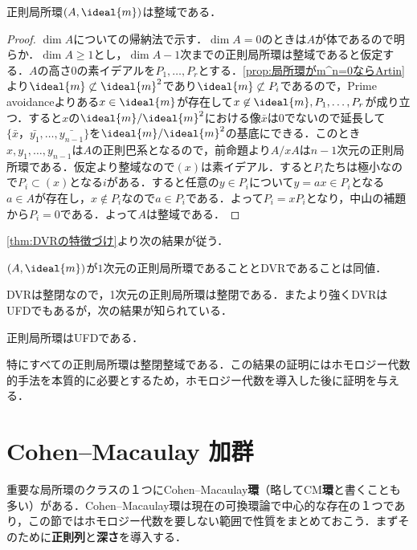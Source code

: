 \begin{thm}\label{thm:正則局所環は整域}
	正則局所環$(A,\ideal{m})$は整域である．
\end{thm}

\begin{proof}
	$\dim A$についての帰納法で示す．$\dim A=0$のときは$A$が体であるので明らか．$\dim A\geq 1$とし，$\dim A-1$次までの正則局所環は整域であると仮定する．$A$の高さ$0$の素イデアルを$P_1,\dots,P_r$とする．\ref{prop:局所環がm^n=0ならArtin}より$\ideal{m}\not\subset\ideal{m}^2$であり$\ideal{m}\not\subset P_i$であるので，Prime avoidanceよりある$x\in\ideal{m}$が存在して$x\not\in\ideal{m},P_1,\dots,P_r$が成り立つ．すると$x$の$\ideal{m}/\ideal{m}^2$における像$\bar{x}$は$0$でないので延長して$\{\bar{x}，\bar{y_1},\dots,\bar{y_{n-1}}\}$を$\ideal{m}/\ideal{m}^2$の基底にできる．このとき$x,y_1,\dots,y_{n-1}$は$A$の正則巴系となるので，前命題より$A/xA$は$n-1$次元の正則局所環である．仮定より整域なので$(x)$は素イデアル．すると$P_i$たちは極小なので$P_i\subset(x)$となる$i$がある．すると任意の$y\in P_i$について$y=ax\in P_i$となる$a\in A$が存在し，$x\not\in P_i$なので$a\in P_i$である．よって$P_i=xP_i$となり，中山の補題から$P_i=0$である．よって$A$は整域である．
\end{proof}

\ref{thm:DVRの特徴づけ}より次の結果が従う．

\begin{cor}
	$(A,\ideal{m})$が$1$次元の正則局所環であることとDVRであることは同値．
\end{cor}

DVRは整閉なので，1次元の正則局所環は整閉である．またより強くDVRはUFDでもあるが，次の結果が知られている．

\begin{thm}
	正則局所環はUFDである．
\end{thm}

特にすべての正則局所環は整閉整域である．この結果の証明にはホモロジー代数的手法を本質的に必要とするため，ホモロジー代数を導入した後に証明を与える．

\section{Cohen--Macaulay 加群}

重要な局所環のクラスの１つにCohen--Macaulay\textbf{環}（略してCM\textbf{環}と書くことも多い）がある．Cohen--Macaulay環は現在の可換環論で中心的な存在の１つであり，この節ではホモロジー代数を要しない範囲で性質をまとめておこう．まずそのために\textbf{正則列}と\textbf{深さ}を導入する．

